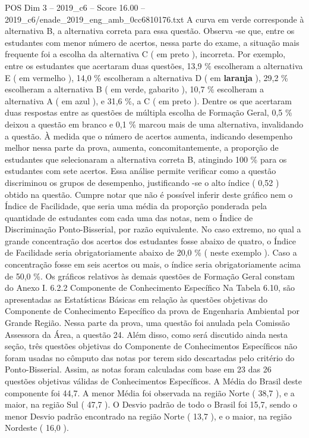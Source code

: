 \begin{textsample}{POS Dim 3 – 2019\_c6 – Score 16.00 – 2019\_c6/enade\_2019\_eng\_amb\_0cc6810176.txt}
A curva em verde corresponde à alternativa B, a alternativa correta para essa questão.
Observa -se que, entre os estudantes com menor número de acertos, nessa parte do exame, a situação mais frequente foi a escolha da alternativa C ( em preto ), incorreta.
Por exemplo, entre os estudantes que acertaram duas questões, 13,9 \% escolheram a alternativa E ( em vermelho ), 14,0 \% escolheram a alternativa D ( em \textbf{laranja} ), 29,2 \% escolheram a alternativa B ( em verde, gabarito ), 10,7 \% escolheram a alternativa A ( em azul ), e 31,6 \%, a C ( em preto ).
Dentre os que acertaram duas respostas entre as questões de múltipla escolha de Formação Geral, 0,5 \% deixou a questão em branco e 0,1 \% marcou mais de uma alternativa, invalidando a questão.
À medida que o número de acertos aumenta, indicando desempenho melhor nessa parte da prova, aumenta, concomitantemente, a proporção de estudantes que selecionaram a alternativa correta B, atingindo 100 \% para os estudantes com sete acertos.
Essa análise permite verificar como a questão discriminou os grupos de desempenho, justificando -se o alto índice ( 0,52 ) obtido na questão.
Cumpre notar que não é possível inferir deste gráfico nem o Índice de Facilidade, que seria uma média da proporção ponderada pela quantidade de estudantes com cada uma das notas, nem o Índice de Discriminação Ponto-Bisserial, por razão equivalente.
No caso extremo, no qual a grande concentração dos acertos dos estudantes fosse abaixo de quatro, o Índice de Facilidade seria obrigatoriamente abaixo de 20,0 \% ( neste exemplo ).
Caso a concentração fosse em seis acertos ou mais, o índice seria obrigatoriamente acima de 50,0 \%.
Os gráficos relativos às demais questões de Formação Geral constam do Anexo I. 6.2.2 Componente de Conhecimento Específico Na Tabela 6.10, são apresentadas as Estatísticas Básicas em relação às questões objetivas do Componente de Conhecimento Específico da prova de Engenharia Ambiental por Grande Região.
Nessa parte da prova, uma questão foi anulada pela Comissão Assessora da Área, a questão 24.
Além disso, como será discutido ainda nesta seção, três questões objetivas do Componente de Conhecimentos Específicos não foram usadas no cômputo das notas por terem sido descartadas pelo critério do Ponto-Bisserial.
Assim, as notas foram calculadas com base em 23 das 26 questões objetivas válidas de Conhecimentos Específicos.
A Média do Brasil deste componente foi 44,7.
A menor Média foi observada na região Norte ( 38,7 ), e a maior, na região Sul ( 47,7 ).
O Desvio padrão de todo o Brasil foi 15,7, sendo o menor Desvio padrão encontrado na região Norte ( 13,7 ), e o maior, na região Nordeste ( 16,0 ).

\end{textsample}
